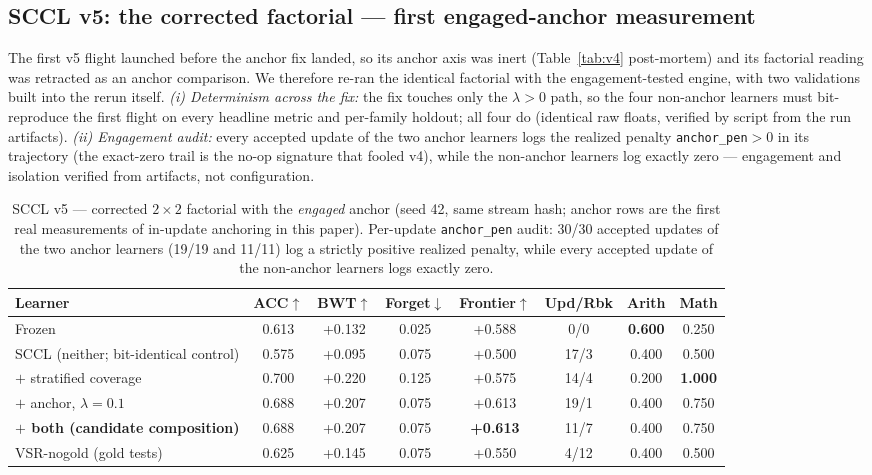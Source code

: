 \documentclass[10pt,conference]{IEEEtran}
\begin{document}
\subsection*{SCCL v5: the corrected factorial --- first engaged-anchor measurement}
\label{sec:v5results}

The first v5 flight launched before the anchor fix landed, so its anchor axis was inert (Table~\ref{tab:v4} post-mortem) and its factorial reading was retracted as an anchor comparison. We therefore re-ran the identical factorial with the engagement-tested engine, with two validations built into the rerun itself. \emph{(i) Determinism across the fix:} the fix touches only the $\lambda{>}0$ path, so the four non-anchor learners must bit-reproduce the first flight on every headline metric and per-family holdout; all four do (identical raw floats, verified by script from the run artifacts). \emph{(ii) Engagement audit:} every accepted update of the two anchor learners logs the realized penalty \texttt{anchor\_pen}$>0$ in its trajectory (the exact-zero trail is the no-op signature that fooled v4), while the non-anchor learners log exactly zero --- engagement and isolation verified from artifacts, not configuration.

\begin{table}[htbp]
\centering
\caption{SCCL v5 --- corrected $2\times2$ factorial with the \emph{engaged} anchor (seed 42, same stream hash; anchor rows are the first real measurements of in-update anchoring in this paper). Per-update \texttt{anchor\_pen} audit: 30/30 accepted updates of the two anchor learners (19/19 and 11/11) log a strictly positive realized penalty, while every accepted update of the non-anchor learners logs exactly zero.}
\label{tab:v5}
\begin{tabular}{lccccccc}
\toprule
Learner & ACC$\uparrow$ & BWT$\uparrow$ & Forget$\downarrow$ & Frontier$\uparrow$ & Upd/Rbk & Arith & Math \\
\midrule
Frozen                                  & 0.613 & +0.132 & 0.025 & +0.588 & 0/0 & \textbf{0.600} & 0.250 \\
SCCL (neither; bit-identical control)   & 0.575 & +0.095 & 0.075 & +0.500 & 17/3 & 0.400 & 0.500 \\
$+$ stratified coverage                 & 0.700 & +0.220 & 0.125 & +0.575 & 14/4 & 0.200 & \textbf{1.000} \\
$+$ anchor, $\lambda{=}0.1$             & 0.688 & +0.207 & 0.075 & +0.613 & 19/1 & 0.400 & 0.750 \\
\textbf{$+$ both (candidate composition)} & 0.688 & +0.207 & 0.075 & \textbf{+0.613} & 11/7 & 0.400 & 0.750 \\
VSR-nogold (gold tests)                 & 0.625 & +0.145 & 0.075 & +0.550 & 4/12 & 0.400 & 0.500 \\
\bottomrule
\end{tabular}
\end{table}
\end{document}
